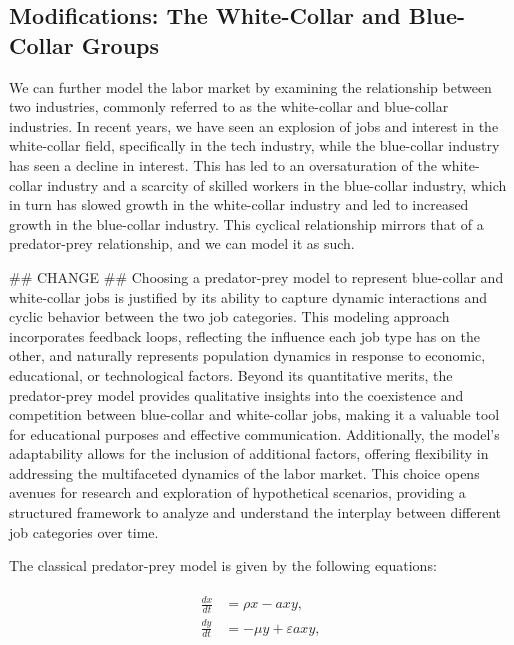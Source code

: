 \documentclass[11pt]{amsart}
\begin{document}
\subsection{Modifications: The White-Collar and Blue-Collar Groups}

We can further model the labor market by examining the relationship between two industries, commonly referred to as the white-collar and blue-collar industries.
In recent years, we have seen an explosion of jobs and interest in the white-collar field, specifically in the tech industry, while the blue-collar industry has seen a decline in interest.
This has led to an oversaturation of the white-collar industry and a scarcity of skilled workers in the blue-collar industry, which in turn has slowed growth in the white-collar industry and led to increased growth in the blue-collar industry.
This cyclical relationship mirrors that of a predator-prey relationship, and we can model it as such. 

## CHANGE ##
Choosing a predator-prey model to represent blue-collar and white-collar jobs is justified by its ability to capture dynamic interactions and 
cyclic behavior between the two job categories. This modeling approach incorporates feedback loops, reflecting the influence each job type has 
on the other, and naturally represents population dynamics in response to economic, educational, or technological factors. 
Beyond its quantitative merits, the predator-prey model provides qualitative insights into the coexistence and competition between 
blue-collar and white-collar jobs, making it a valuable tool for educational purposes and effective communication. 
Additionally, the model's adaptability allows for the inclusion of additional factors, offering flexibility in addressing 
the multifaceted dynamics of the labor market. This choice opens avenues for research and exploration of hypothetical scenarios, 
providing a structured framework to analyze and understand the interplay between different job categories over time.

The classical predator-prey model is given by the following equations:

\begin{align}
    \begin{split}
        \frac{dx}{dt} &= \rho x - a x y, \\
        \frac{dy}{dt} &= -\mu y + \varepsilon a x y,
    \end{split}
\end{align}
\end{document}

